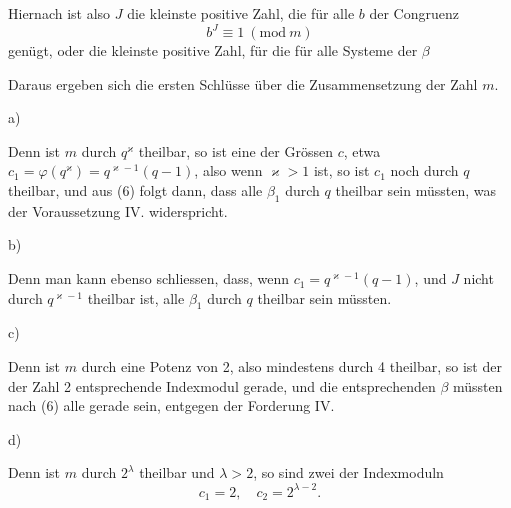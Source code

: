 
Hiernach ist also $J$ die kleinste positive Zahl, die für alle $b$ der Congruenz
\[
b^J\equiv 1\ (\mathrm{mod}\ m)
\]
genügt, oder die kleinste positive Zahl, für die für alle Systeme der $\beta$

Daraus ergeben sich die ersten Schlüsse über die Zusammensetzung der Zahl $m$.

a) 

Denn ist $m$ durch $q^\varkappa$ theilbar, so ist eine der Grössen $c$, etwa $c_1=\varphi(q^\varkappa)=q^{\varkappa-1}(q-1)$, also wenn $\varkappa>1$ ist, so ist $c_1$ noch durch $q$ theilbar, und aus (6) folgt dann, dass alle $\beta_1$ durch $q$ theilbar sein müssten, was der Voraussetzung IV. widerspricht.

b) 

Denn man kann ebenso schliessen, dass, wenn $c_1=q^{\varkappa-1}(q-1)$, und $J$ nicht durch $q^{\varkappa-1}$ theilbar ist, alle $\beta_1$ durch $q$ theilbar sein müssten.

c) 

Denn ist $m$ durch eine Potenz von 2, also mindestens durch 4 theilbar, so ist der der Zahl 2 entsprechende Indexmodul gerade, und die entsprechenden $\beta$ müssten nach (6) alle gerade sein, entgegen der Forderung IV.

d) 

Denn ist $m$ durch $2^\lambda$ theilbar und $\lambda>2$, so sind zwei der Indexmoduln
\[
c_1=2,\quad c_2=2^{\lambda-2}.
\]
